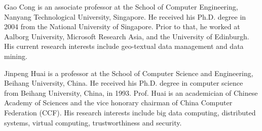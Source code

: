 \documentclass[10pt,journal,compsoc,twoside]{IEEEtran}
\newcommand{\eat}[1]{}
\begin{document}
\vspace{-6ex}
\begin{IEEEbiography}{Gao Cong} is an associate professor at the School of Computer Engineering, Nanyang Technological University, Singapore. He received his Ph.D. degree in 2004 from the National University of Singapore. Prior to that, he worked at Aalborg University, Microsoft Research Asia, and the University of Edinburgh. His current research interests include geo-textual data management and data mining.
\end{IEEEbiography}
\vspace{-6ex}
\begin{IEEEbiography}{Jinpeng Huai} is a professor at the School of Computer Science and Engineering, Beihang University, China. He received his Ph.D. degree in computer science from Beihang University, China, in 1993. Prof. Huai is an academician of Chinese Academy of Sciences and the vice honorary chairman of China Computer Federation (CCF). His research interests include big data computing, distributed systems, virtual computing, trustworthiness and security.
\end{IEEEbiography}

\vfill

%

%

\eat{%

\begin{IEEEbiography}{Michael Shell}
Biography text here.
\end{IEEEbiography}

\begin{IEEEbiographynophoto}{John Doe}
Biography text here.
\end{IEEEbiographynophoto}


\begin{IEEEbiographynophoto}{Jane Doe}
Biography text here.
\end{IEEEbiographynophoto}

}%
\end{document}
